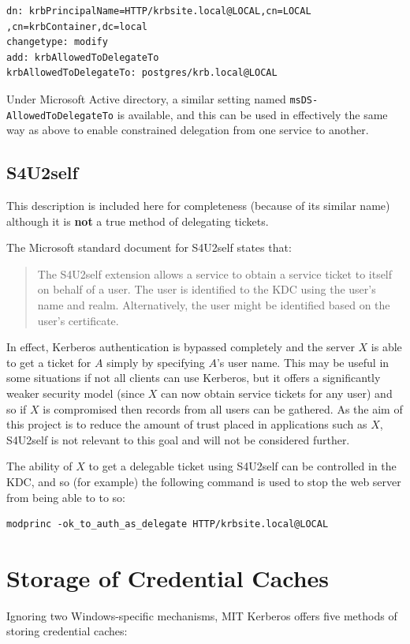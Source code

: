 \documentclass[12pt]{report}
\begin{document}
\begin{verbatim}
dn: krbPrincipalName=HTTP/krbsite.local@LOCAL,cn=LOCAL
,cn=krbContainer,dc=local
changetype: modify
add: krbAllowedToDelegateTo
krbAllowedToDelegateTo: postgres/krb.local@LOCAL
\end{verbatim}

Under Microsoft Active directory, a similar setting named \texttt{msDS-AllowedToDelegateTo} is available, and this can be used in effectively the same way as above to enable constrained delegation from one service to another\cite{MS-deleg-attribute}.

\subsection{S4U2self}
This description is included here for completeness (because of its similar name) although it is \textbf{not} a true method of delegating tickets.

The Microsoft standard document for S4U2self\cite{MS-s4u2} states that:

\begin{quote}
  The S4U2self extension allows a service to obtain a service ticket to itself on behalf of a user. The user is identified to the KDC using the user's name and realm. Alternatively, the user might be identified based on the user's certificate.
\end{quote}

In effect, Kerberos authentication is bypassed completely and the server $X$ is able to get a ticket for $A$ simply by specifying $A$'s user name. This may be useful in some situations if not all clients can use Kerberos, but it offers a significantly weaker security model (since $X$ can now obtain service tickets for any user) and so if $X$ is compromised then records from all users can be gathered. As the aim of this project is to reduce the amount of trust placed in applications such as $X$, S4U2self is not relevant to this goal and will not be considered further.

The ability of $X$ to get a delegable ticket using S4U2self can be controlled in the KDC, and so (for example) the following command is used to stop the web server from being able to to so:

\begin{verbatim}
modprinc -ok_to_auth_as_delegate HTTP/krbsite.local@LOCAL
\end{verbatim}

\section{Storage of Credential Caches}
\label{sec:storage_of_credential_caches}
Ignoring two Windows-specific mechanisms, MIT Kerberos offers five methods of storing credential caches\cite{MIT-ccache-types}:
\end{document}
